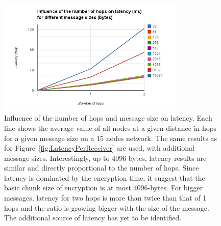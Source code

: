 \begin{figure}[htb]
\begin{center}
\includegraphics[width=0.8\textwidth]{figures/LatencyComparisonsHopsMsgSize}
\caption[Influence of the number of hops and message size on latency.]{\label{fig:LatencyComparisonsHopsMsgSize} Influence of the number of hops and message size on latency. Each line shows the average value of all nodes at a given distance in hops for a given message size on a 15 nodes network. The same results as for Figure~\ref{fig:LatencyPerReceiver} are used, with additional message sizes. Interestingly, up to 4096 bytes, latency results are similar and directly proportional to the number of hops. Since latency is dominated by the encryption time, it suggest that the basic chunk size of encryption is at most 4096-bytes. For bigger messages, latency for two hops is more than twice than that of 1 hops and the ratio is growing bigger with the size of the message. The additional source of latency has yet to be identified.
}
\end{center}
\end{figure}




